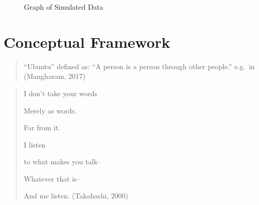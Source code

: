 \documentclass[
  letterpaper,
  DIV=11,
  numbers=noendperiod]{scrreprt}
\begin{document}
\begin{figure}


\caption{\label{fig-data}Graph of Simulated Data}

\end{figure}%


\chapter{Conceptual Framework}\label{sec-conceptualframework}

\begin{quote}
``Ubuntu'' defined as: ``A person is a person through other people.''
e.g.~in (Mangharam, 2017)
\end{quote}

\begin{quote}
I don't take your words

Merely as words.

Far from it.

I listen

to what makes you talk--

Whatever that is--

And me listen. (Takahashi, 2000)
\end{quote}
\end{document}
